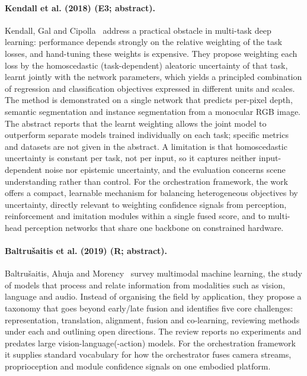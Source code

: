 \documentclass[10pt,a4paper]{article}
\begin{document}
\paragraph{Kendall et al. (2018) (E3; abstract).} Kendall, Gal and Cipolla~\cite{Kendall2018} address a practical obstacle in multi-task deep learning: performance depends strongly on the relative weighting of the task losses, and hand-tuning these weights is expensive. They propose weighting each loss by the homoscedastic (task-dependent) aleatoric uncertainty of that task, learnt jointly with the network parameters, which yields a principled combination of regression and classification objectives expressed in different units and scales. The method is demonstrated on a single network that predicts per-pixel depth, semantic segmentation and instance segmentation from a monocular RGB image. The abstract reports that the learnt weighting allows the joint model to outperform separate models trained individually on each task; specific metrics and datasets are not given in the abstract. A limitation is that homoscedastic uncertainty is constant per task, not per input, so it captures neither input-dependent noise nor epistemic uncertainty, and the evaluation concerns scene understanding rather than control. For the orchestration framework, the work offers a compact, learnable mechanism for balancing heterogeneous objectives by uncertainty, directly relevant to weighting confidence signals from perception, reinforcement and imitation modules within a single fused score, and to multi-head perception networks that share one backbone on constrained hardware.

\paragraph{Baltrušaitis et al. (2019) (R; abstract).} Baltrušaitis, Ahuja and Morency~\cite{Baltrusaitis2019} survey multimodal machine learning, the study of models that process and relate information from modalities such as vision, language and audio. Instead of organising the field by application, they propose a taxonomy that goes beyond early/late fusion and identifies five core challenges: representation, translation, alignment, fusion and co-learning, reviewing methods under each and outlining open directions. The review reports no experiments and predates large vision-language(-action) models. For the orchestration framework it supplies standard vocabulary for how the orchestrator fuses camera streams, proprioception and module confidence signals on one embodied platform.
\end{document}
